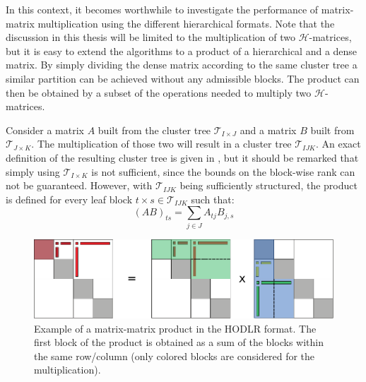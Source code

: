 \noindent In this context, it becomes worthwhile to investigate the performance of matrix-matrix multiplication using the different hierarchical formats. Note that the discussion in this thesis will be limited to the multiplication of two $\mathcal{H}$-matrices, but it is easy to extend the algorithms to a product of a hierarchical and a dense matrix. By simply dividing the dense matrix according to the same cluster tree a similar partition can be achieved without any admissible blocks. The product can then be obtained by a subset of the operations needed to multiply two $\mathcal{H}$-matrices.

Consider a matrix $A$ built from the cluster tree $\mathcal{T}_{I\times J}$ and a matrix $B$ built from $\mathcal{T}_{J\times K}$. The multiplication of those two will result in a cluster tree $\mathcal{T}_{IJK}$. An exact definition of the resulting cluster tree is given in \cite{bebendorf_hierarchical_2008}, but it should be remarked that simply using $\mathcal{T}_{I\times K}$ is not sufficient, since the bounds on the block-wise rank can not be guaranteed. However, with $\mathcal{T}_{IJK}$ being sufficiently structured, the product is defined for every leaf block $t \times s \in \mathcal{T}_{IJK}$ such that:
\begin{equation}
    (AB)_{ts} = \sum_{j \in J}A_{tj}B_{j,s}
\end{equation}

\begin{figure}[h]
    \centering
    \includegraphics[width=\linewidth]{chapters/4_hierarchical_matrices/figures/matmul.pdf}
    \caption[Hierarchical Matrix-Matrix Product]{Example of a matrix-matrix product in the HODLR format. The first block of the product is obtained as a sum of the blocks within the same row/column (only colored blocks are considered for the multiplication).}
    \label{fig:matmul}
\end{figure}

